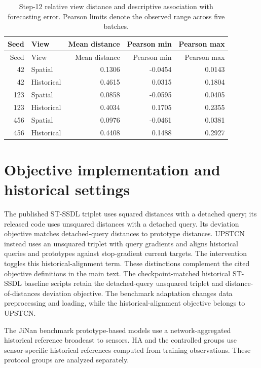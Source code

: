 \documentclass[a4paper,10pt]{article}
\begin{document}
\begingroup\footnotesize\setlength{\tabcolsep}{4pt}
\begin{longtable}{rlrrr}
\caption{Step-12 relative view distance and descriptive association with forecasting error. Pearson limits denote the observed range across five batches.}\\
\toprule
Seed & View & Mean distance & Pearson min & Pearson max \\
\midrule\endfirsthead
\toprule
Seed & View & Mean distance & Pearson min & Pearson max \\
\midrule\endhead

42 & Spatial & 0.1306 & -0.0454 & 0.0143 \\

42 & Historical & 0.4615 & 0.0315 & 0.1804 \\

123 & Spatial & 0.0858 & -0.0595 & 0.0405 \\

123 & Historical & 0.4034 & 0.1705 & 0.2355 \\

456 & Spatial & 0.0976 & -0.0461 & 0.0381 \\

456 & Historical & 0.4408 & 0.1488 & 0.2927 \\

\bottomrule
\end{longtable}\endgroup

\section{Objective implementation and historical settings}
The published ST-SSDL triplet uses squared distances with a detached query; its released code uses unsquared distances with a detached query. Its deviation objective matches detached-query distances to prototype distances. UPSTCN instead uses an unsquared triplet with query gradients and aligns historical queries and prototypes against stop-gradient current targets. The intervention toggles this historical-alignment term. These distinctions complement the cited objective definitions in the main text. The checkpoint-matched historical ST-SSDL baseline scripts retain the detached-query unsquared triplet and distance-of-distances deviation objective. The benchmark adaptation changes data preprocessing and loading, while the historical-alignment objective belongs to UPSTCN.

The JiNan benchmark prototype-based models use a network-aggregated historical reference broadcast to sensors. HA and the controlled groups use sensor-specific historical references computed from training observations. These protocol groups are analyzed separately.
\end{document}
